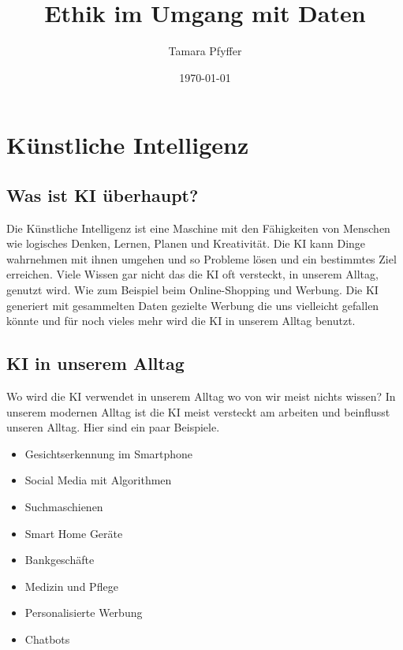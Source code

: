 \documentclass{report}
\title{Ethik im Umgang mit Daten}
\author{Tamara Pfyffer}
\date{\today}
\begin{document}
\maketitle

\tableofcontents

\chapter{Künstliche Intelligenz}

\section{Was ist KI überhaupt?}
Die Künstliche Intelligenz ist eine Maschine mit den Fähigkeiten von Menschen wie logisches Denken, Lernen, Planen und Kreativität. Die KI kann
Dinge wahrnehmen mit ihnen umgehen und so Probleme lösen und ein bestimmtes Ziel erreichen. Viele Wissen gar nicht das die KI oft versteckt,
in unserem Alltag, genutzt wird. Wie zum Beispiel beim Online-Shopping
und Werbung. Die KI generiert mit gesammelten Daten gezielte Werbung
die uns vielleicht gefallen könnte und für noch vieles mehr wird die KI in
unserem Alltag benutzt. 
\section{KI in unserem Alltag}
Wo wird die KI verwendet in unserem Alltag wo von wir meist nichts wissen? In unserem modernen Alltag ist die KI meist versteckt am arbeiten und beinflusst unseren Alltag. Hier sind ein paar Beispiele.
\begin{itemize}
    \item Gesichtserkennung im Smartphone
    \item Social Media mit Algorithmen
    \item Suchmaschienen
    \item Smart Home Geräte
    \item Bankgeschäfte
    \item Medizin und Pflege
    \item Personalisierte Werbung
    \item Chatbots
\end{itemize}
\end{document}
